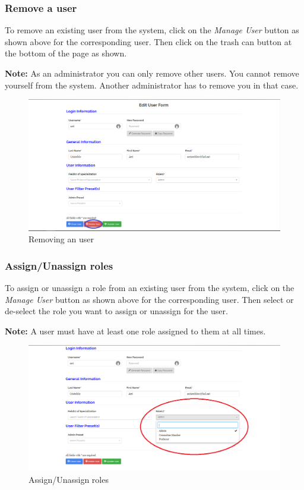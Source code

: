 \documentclass[fontsize=12pt,paper=letter,twoside]{scrartcl}
\begin{document}
\subsubsection{Remove a user}
To remove an existing user from the system, click on the \emph{Manage User} button as shown above for the corresponding user. Then click on the trash can button at the bottom of the page as shown.

\smallskip
\noindent \textbf{Note:} As an administrator you can only remove other users. You cannot remove yourself from the system. Another administrator has to remove you in that case.

\begin{figure}[!htb]
\begin{center}
\includegraphics[width=.99\textwidth]{images/adm/mu/remove_user.png}
\end{center}
\caption{Removing an user}
\label{fig:adm/remove_user}
\end{figure}

\clearpage
\subsubsection{Assign/Unassign roles}
To assign or unassign a role from an existing user from the system, click on the \emph{Manage User} button as shown above for the corresponding user. Then select or de-select the role you want to assign or unassign for the user.

\smallskip
\noindent \textbf{Note:} A user must have at least one role assigned to them at all times.

\begin{figure}[!htb]
\begin{center}
\includegraphics[width=.99\textwidth]{images/adm/mu/edit_roles.png}
\end{center}
\caption{Assign/Unassign roles}
\label{fig:adm/edit_roles}
\end{figure}
\end{document}
